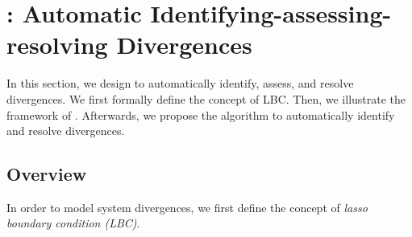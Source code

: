 \section{\Solver: Automatic Identifying-assessing-resolving Divergences}\label{sec:method}

In this section, we design \Solver to automatically identify, assess, and resolve divergences.
We first formally define the concept of LBC.
Then, we illustrate the framework of \Solver.
Afterwards, we propose the algorithm to automatically identify and resolve divergences.

\subsection{Overview}

In order to model system divergences, we first define the concept of {\em lasso boundary condition (LBC)}.


